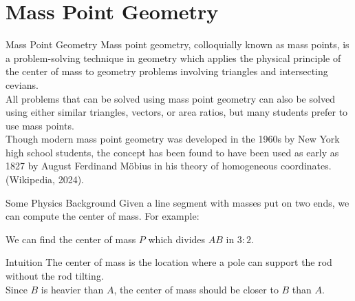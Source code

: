 \documentclass{beamer}
\begin{document}
\section{Mass Point Geometry}
\begin{frame}{Mass Point Geometry}
Mass point geometry, colloquially known as mass points, is a problem-solving technique in geometry which applies the physical principle of the center of mass to geometry problems involving triangles and intersecting cevians. \\
All problems that can be solved using mass point geometry can also be solved using either similar triangles, vectors, or area ratios, but many students prefer to use mass points. \\
Though modern mass point geometry was developed in the 1960s by New York high school students, the concept has been found to have been used as early as 1827 by August Ferdinand Möbius in his theory of homogeneous coordinates. (Wikipedia, 2024).
\end{frame}

\begin{frame}{Some Physics Background}
	Given a line segment with masses put on two ends, we can compute the center of mass. For example:
	\begin{figure}[H]
	\end{figure}
	We can find the center of mass $P$ which divides $AB$ in $3:2$.
	\begin{figure}[H]
	\end{figure}
	\begin{block}{Intuition}
		The center of mass is the location where a pole can support the rod without the rod tilting. \\
		Since $B$ is heavier than $A$, the center of mass should be closer to $B$ than $A$.
	\end{block}
\end{frame}
\end{document}
